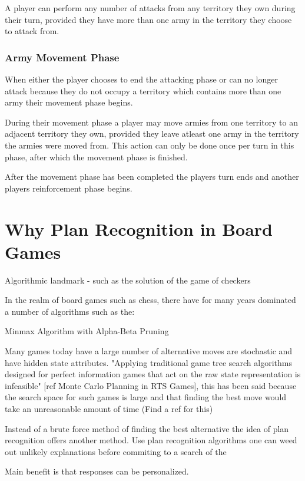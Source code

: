 \documentclass[parskip]{cs4rep}
\begin{document}
A player can perform any number of attacks from any territory they own during their turn, provided they have more than one army in the territory they choose to attack from.

\subsubsection{Army Movement Phase}

When either the player chooses to end the attacking phase or can no longer attack because they do not occupy a territory which contains more than one army their movement phase begins.

During their movement phase a player may move armies from one territory to an adjacent territory they own, provided they leave atleast one army in the territory the armies were moved from. This action can only be done once per turn in this phase, after which the movement phase is finished.

After the movement phase has been completed the players turn ends and another players reinforcement phase begins.
\newpage

\section{Why Plan Recognition in Board Games}

Algorithmic landmark - such as the solution of the game of checkers 

In the realm of board games such as chess, there have for many years dominated a number of algorithms such as the:

Minmax Algorithm with Alpha-Beta Pruning

Many games today have a large number of alternative moves are stochastic and have hidden state attributes. "Applying traditional game tree search algorithms designed for perfect information games that act on the raw state representation is infeasible" [ref Monte Carlo Planning in RTS Games], this has been said because the search space for such games is large and that finding the best move would take an unreasonable amount of time (Find a ref for this)

Instead of a brute force method of finding the best alternative the idea of plan recognition offers another method. Use plan recognition algorithms one can weed out unlikely explanations before commiting to a search of the 

Main benefit is that responses can be personalized.
\end{document}
